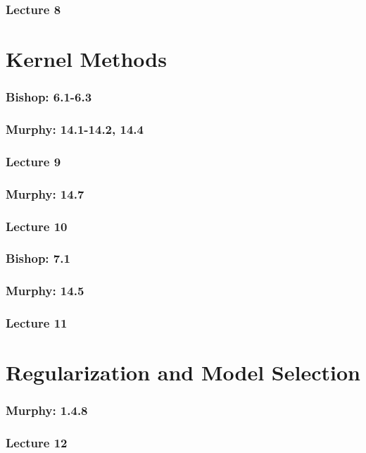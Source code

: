 \documentclass[english, 11pt]{article}
\begin{document}
		\subsubsection{Lecture 8}

\section{Kernel Methods}
		\subsubsection{Bishop: 6.1-6.3}
		\subsubsection{Murphy: 14.1-14.2, 14.4}
		\subsubsection{Lecture 9}

		\subsubsection{Murphy: 14.7}
		\subsubsection{Lecture 10}

		\subsubsection{Bishop: 7.1}
		\subsubsection{Murphy: 14.5}
		\subsubsection{Lecture 11}

\section{Regularization and Model Selection}
		\subsubsection{Murphy: 1.4.8}
		\subsubsection{Lecture 12}
\end{document}
